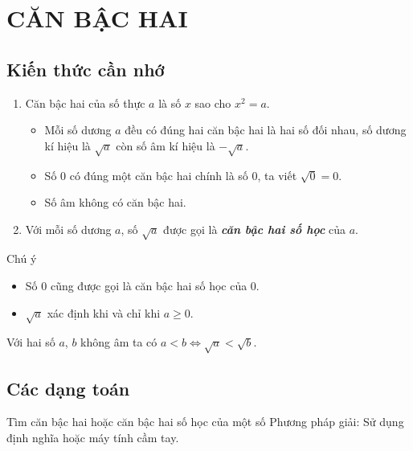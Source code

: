 \section{CĂN BẬC HAI}
\subsection{Kiến thức cần nhớ}
\begin{dn}\hfill
	\begin{enumerate}
		\item Căn bậc hai của số thực $a$ là số $x$ sao cho $x^2 =a$.
		\begin{itemize}
			\item Mỗi số dương $a$ đều có đúng hai căn bậc hai là hai số đối nhau, số dương kí hiệu là $\sqrt{a}$ còn số âm kí hiệu là $-\sqrt{a}$.
			\item Số $0$ có đúng một căn bậc hai chính là số $0$, ta viết $\sqrt{0}=0$.
			\item Số âm không có căn bậc hai.
		\end{itemize}
		\item Với mỗi số dương $a$, số $\sqrt{a}$ được gọi là \textbf{\textit{căn bậc hai số học}} của $a$.
	\end{enumerate}
	\begin{note} Chú ý
		\begin{itemize}
			\item Số $0$ cũng được gọi là căn bậc hai số học của $0$.
			\item $\sqrt{a}$ xác định khi và chỉ khi $a\ge 0$.
		\end{itemize}
	\end{note}
\end{dn}  

\begin{dl}
	Với hai số $a$, $b$ không âm ta có $a<b \Leftrightarrow \sqrt{a}<\sqrt{b}$.
\end{dl}

\subsection{Các dạng toán}

\begin{dang}{Tìm căn bậc hai hoặc căn bậc hai số học của một số}
	Phương pháp giải: Sử dụng định nghĩa hoặc máy tính cầm tay.
\end{dang}

